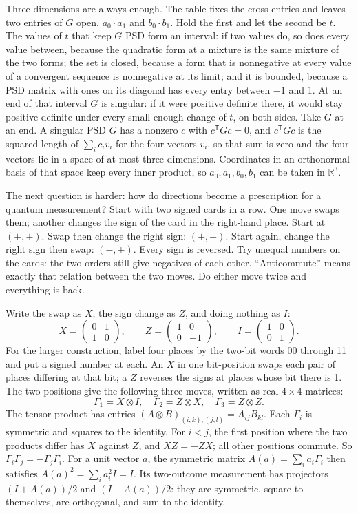 \documentclass[11pt,twoside]{article}
\theoremstyle{thielethm}
\theoremstyle{thieledef}
\theoremstyle{thieledef}
\theoremstyle{thieledef}
\theoremstyle{thielethm}
\theoremstyle{thieleobs}
\theoremstyle{thielethm}
\begin{document}
Three dimensions are always enough. The table fixes the cross entries and leaves two entries of
$G$ open, $a_0\cdot a_1$ and $b_0\cdot b_1$. Hold the first and let the second be $t$. The values
of $t$ that keep $G$ PSD form an interval: if two values do, so does every value between, because
the quadratic form at a mixture is the same mixture of the two forms; the set is closed, because a
form that is nonnegative at every value of a convergent sequence is nonnegative at its limit; and
it is bounded, because a PSD matrix with ones on its diagonal has every entry between $-1$ and 1.
At an end of that interval $G$ is singular: if it were positive definite there, it would stay
positive definite under every small enough change of $t$, on both sides. Take $G$ at an end. A
singular PSD $G$ has a nonzero $c$ with $c^{\mathsf T}Gc=0$, and $c^{\mathsf T}Gc$ is the squared
length of $\sum_i c_iv_i$ for the four vectors $v_i$, so that sum is zero and the four vectors lie
in a space of at most three dimensions. Coordinates in an orthonormal basis of that space keep every
inner product, so $a_0,a_1,b_0,b_1$ can be taken in $\mathbb R^3$.

The next question is harder: how do directions become a prescription for a
quantum measurement? Start with two signed cards in a row. One move swaps them;
another changes the sign of the card in the right-hand place. Start at $(+,+)$.
Swap then change the right sign: $(+,-)$. Start again, change the right sign then
swap: $(-,+)$. Every sign is reversed. Try unequal numbers on the cards: the two
orders still give negatives of each other. ``Anticommute'' means exactly that
relation between the two moves. Do either move twice and everything is back.

Write the swap as $X$, the sign change as $Z$, and doing nothing as $I$:
\[
X=\begin{pmatrix}0&1\\1&0\end{pmatrix},\qquad
Z=\begin{pmatrix}1&0\\0&-1\end{pmatrix},\qquad I=\begin{pmatrix}1&0\\0&1\end{pmatrix}.
\]
For the larger construction, label four places by the two-bit words 00 through
11 and put a signed number at each. An $X$ in one bit-position swaps each pair of
places differing at that bit; a $Z$ reverses the signs at places whose bit there is 1.
The two positions give the following three moves, written as real $4\times4$
matrices:
\[
\Gamma_1=X\otimes I,\quad
\Gamma_2=Z\otimes X,\quad
\Gamma_3=Z\otimes Z.
\]
The tensor product has entries $(A\otimes B)_{(i,k),(j,l)}=A_{ij}B_{kl}$.
Each $\Gamma_i$ is symmetric and squares to the identity. For $i<j$, the first
position where the two products differ has $X$ against $Z$, and $XZ=-ZX$; all
other positions commute. So $\Gamma_i\Gamma_j=-\Gamma_j\Gamma_i$.
For a unit vector $a$, the symmetric matrix $A(a)=\sum_i a_i\Gamma_i$ then
satisfies $A(a)^2=\sum_i a_i^2 I=I$. Its two-outcome measurement has projectors
$(I+A(a))/2$ and $(I-A(a))/2$: they are symmetric, square to themselves, are
orthogonal, and sum to the identity.
\end{document}
